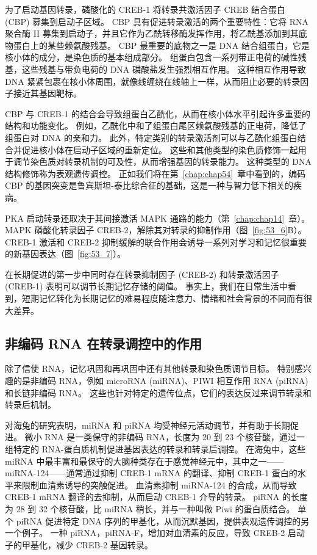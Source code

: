为了启动基因转录，磷酸化的 CREB-1 将转录共激活因子 CREB 结合蛋白 (CBP) 募集到启动子区域。
CBP 具有促进转录激活的两个重要特性：它将 RNA 聚合酶 II 募集到启动子，并且它作为乙酰转移酶发挥作用，将乙酰基添加到其底物蛋白上的某些赖氨酸残基。
CBP 最重要的底物之一是 DNA 结合组蛋白，它是核小体的成分，是染色质的基本组成部分。
组蛋白包含一系列带正电荷的碱性残基，这些残基与带负电荷的 DNA 磷酸盐发生强烈相互作用。
这种相互作用导致 DNA 紧紧包裹在核小体周围，就像线缠绕在线轴上一样，从而阻止必要的转录因子接近其基因靶标。


CBP 与 CREB-1 的结合会导致组蛋白乙酰化，从而在核小体水平引起许多重要的结构和功能变化。
例如，乙酰化中和了组蛋白尾区赖氨酸残基的正电荷，降低了组蛋白对 DNA 的亲和力。
此外，特定类别的转录激活剂可以与乙酰化组蛋白结合并促进核小体在启动子区域的重新定位。 这些和其他类型的染色质修饰一起用于调节染色质对转录机制的可及性，从而增强基因的转录能力。
这种类型的 DNA 结构修饰称为表观遗传调控。
正如我们将在第~\ref{chap:chap54}~章中看到的，编码 CBP 的基因突变是鲁宾斯坦-泰比综合征的基础，这是一种与智力低下相关的疾病。


PKA 启动转录还取决于其间接激活 MAPK 通路的能力（第~\ref{chap:chap14}~章）。
MAPK 磷酸化转录因子 CREB-2，解除其对转录的抑制作用（图~\ref{fig:53_6}B）。
CREB-1 激活和 CREB-2 抑制缓解的联合作用会诱导一系列对学习和记忆很重要的新基因表达（图~\ref{fig:53_7}）。


在长期促进的第一步中同时存在转录抑制因子 (CREB-2) 和转录激活因子 (CREB-1) 表明可以调节长期记忆存储的阈值。
事实上，我们在日常生活中看到，短期记忆转化为长期记忆的难易程度随注意力、情绪和社会背景的不同而有很大差异。



\subsection{非编码 RNA 在转录调控中的作用}

除了信使 RNA，记忆巩固和再巩固中还有其他转录和染色质调节目标。
特别感兴趣的是非编码 RNA，例如 microRNA (miRNA)、PIWI 相互作用 RNA (piRNA) 和长链非编码 RNA。
这些也针对特定的遗传位点，它们的表达反过来调节转录和转录后机制。


对海兔的研究表明，miRNA 和 piRNA 均受神经元活动调节，并有助于长期促进。
微小 RNA 是一类保守的非编码 RNA，长度为 20 到 23 个核苷酸，通过一组特定的 RNA-蛋白质机制促进基因表达的转录和转录后调控。
在海兔中，这些 miRNA 中最丰富和最保守的大脑种类存在于感觉神经元中，其中之一——miRNA-124——通常通过抑制 CREB-1 mRNA 的翻译、抑制 CREB-1 蛋白的水平来限制血清素诱导的突触促进。
血清素抑制 miRNA-124 的合成，从而导致 CREB-1 mRNA 翻译的去抑制，从而启动 CREB-1 介导的转录。
piRNA 的长度为 28 到 32 个核苷酸，比 miRNA 稍长，并与一种叫做 Piwi 的蛋白质结合。
单个 piRNA 促进特定 DNA 序列的甲基化，从而沉默基因，提供表观遗传调控的另一个例子。
一种 piRNA，piRNA-F，增加对血清素的反应，导致 CREB-2 启动子的甲基化，减少 CREB-2 基因转录。


